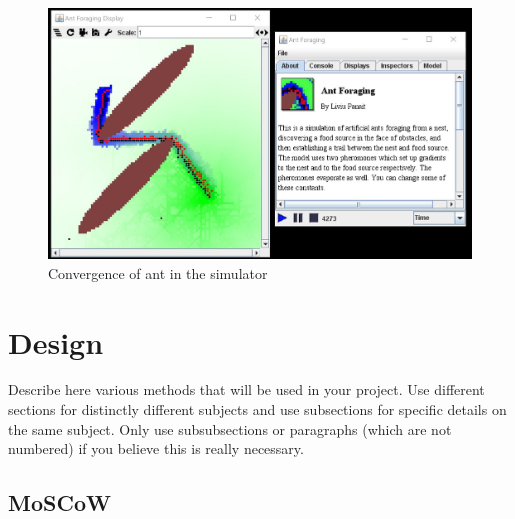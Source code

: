 \documentclass[a4paper, oneside, 11pt]{report}
\begin{document}
\begin{figure}[htb]
	\includegraphics[width=1.0 \columnwidth]{MASON_Ant_Converged.jpg}
	\caption{Convergence of ant in the simulator \citep{Ant_Simulator}}
	\label{MASON_Ant_Converged}
\end{figure}

\chapter{Design}
\label{chap:design}
Describe here various methods that will be used in your project. Use different sections for distinctly different subjects and use subsections for specific details on the same subject. Only use subsubsections or paragraphs (which are not numbered) if you believe this is really necessary. 

\section{MoSCoW}
\end{document}
